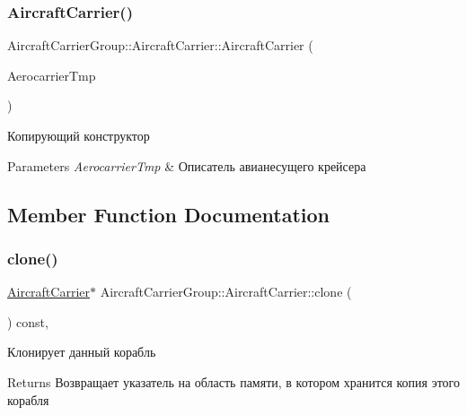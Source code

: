 \subsubsection{\texorpdfstring{Aircraft\+Carrier()}{AircraftCarrier()}\hspace{0.1cm}{\footnotesize\ttfamily [2/2]}}
{\footnotesize\ttfamily Aircraft\+Carrier\+Group\+::\+Aircraft\+Carrier\+::\+Aircraft\+Carrier (\begin{DoxyParamCaption}\item[{const \mbox{\hyperlink{class_aircraft_carrier_group_1_1_aircraft_carrier}{Aircraft\+Carrier}} \&}]{Aerocarrier\+Tmp }\end{DoxyParamCaption})}



Копирующий конструктор 


\begin{DoxyParams}{Parameters}
{\em Aerocarrier\+Tmp} & Описатель авианесущего крейсера \\
\hline
\end{DoxyParams}


\subsection{Member Function Documentation}
\mbox{\label{class_aircraft_carrier_group_1_1_aircraft_carrier_ab2f921c586a31f9933874f437baf9c16}} 
\subsubsection{\texorpdfstring{clone()}{clone()}}
{\footnotesize\ttfamily \mbox{\hyperlink{class_aircraft_carrier_group_1_1_aircraft_carrier}{Aircraft\+Carrier}}$\ast$ Aircraft\+Carrier\+Group\+::\+Aircraft\+Carrier\+::clone (\begin{DoxyParamCaption}{ }\end{DoxyParamCaption}) const\hspace{0.3cm}{\ttfamily [inline]}, {\ttfamily [virtual]}}



Клонирует данный корабль 

\begin{DoxyReturn}{Returns}
Возвращает указатель на область памяти, в котором хранится копия этого корабля 
\end{DoxyReturn}


